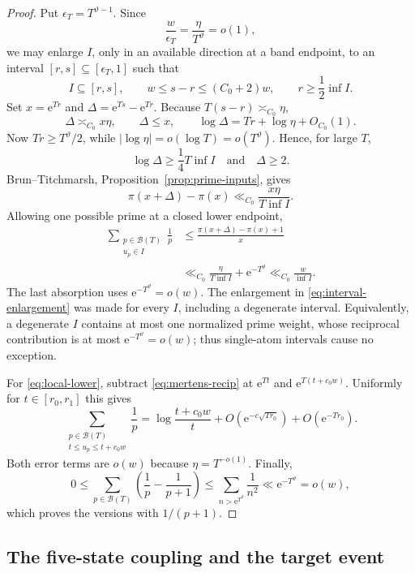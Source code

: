 \documentclass[11pt]{article}
\numberwithin{equation}{section}
\theoremstyle{plain}
\newcommand{\1}{\mathbf 1}
\newcommand{\e}{\mathrm e}
\newcommand{\cB}{\mathcal B}
\begin{document}
\begin{proof}
Put $\epsilon_T=T^{\vartheta-1}$.  Since
\[
 \frac{w}{\epsilon_T}=\frac{\eta}{T^\vartheta}=o(1),
\]
we may enlarge $I$, only in an available direction at a band endpoint, to
an interval $[r,s]\subseteq[\epsilon_T,1]$ such that
\begin{equation}\label{eq:interval-enlargement}
 I\subseteq[r,s],\qquad
 w\le s-r\le(C_0+2)w,\qquad
 r\ge\frac12\inf I.
\end{equation}
Set $x=\e^{Tr}$ and $\Delta=\e^{Ts}-\e^{Tr}$.  Because
$T(s-r)\asymp_{C_0}\eta$,
\[
 \Delta\asymp_{C_0}x\eta,\qquad
 \Delta\le x,\qquad
 \log\Delta=Tr+\log\eta+O_{C_0}(1).
\]
Now $Tr\ge T^\vartheta/2$, while
$|\log\eta|=o(\log T)=o(T^\vartheta)$.  Hence, for large $T$,
\[
 \log\Delta\ge\frac14T\inf I
 \quad\text{and}\quad \Delta\ge2.
\]
Brun--Titchmarsh, Proposition~\ref{prop:prime-inputs}, gives
\[
 \pi(x+\Delta)-\pi(x)
 \ll_{C_0}\frac{x\eta}{T\inf I}.
\]
Allowing one possible prime at a closed lower endpoint,
\begin{align*}
 \sum_{\substack{p\in\cB(T)\\u_p\in I}}\frac1p
 &\le\frac{\pi(x+\Delta)-\pi(x)+1}{x}\\
 &\ll_{C_0}\frac{\eta}{T\inf I}+\e^{-T^\vartheta}
 \ll_{C_0}\frac{w}{\inf I}.
\end{align*}
 The last absorption uses $\e^{-T^\vartheta}=o(w)$.  The enlargement in
 \eqref{eq:interval-enlargement} was made for every $I$, including a
 degenerate interval.  Equivalently, a degenerate $I$ contains at most one
 normalized prime weight, whose reciprocal contribution is at most
 $\e^{-T^\vartheta}=o(w)$; thus single-atom intervals cause no exception.

For \eqref{eq:local-lower}, subtract
\eqref{eq:mertens-recip} at $\e^{Tt}$ and
$\e^{T(t+c_0w)}$.  Uniformly for $t\in[r_0,r_1]$ this gives
\[
 \sum_{\substack{p\in\cB(T)\\t\le u_p\le t+c_0w}}\frac1p
 =
 \log\frac{t+c_0w}{t}
 +O(\e^{-c\sqrt{Tr_0}})+O(\e^{-Tr_0}).
\]
Both error terms are $o(w)$ because $\eta=T^{-o(1)}$.  Finally,
\[
 0\le
 \sum_{p\in\cB(T)}
 \left(\frac1p-\frac1{p+1}\right)
 \le\sum_{n>\e^{T^\vartheta}}\frac1{n^2}
 \ll\e^{-T^\vartheta}=o(w),
\]
which proves the versions with $1/(p+1)$.
\end{proof}

\subsection{The five-state coupling and the target event}
\end{document}
